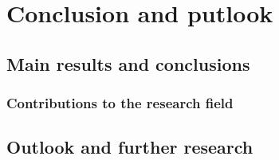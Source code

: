 \chapter{Conclusion and putlook}
\label{ch:conclusions}


\section{Main results and conclusions}


\subsection{Contributions to the research field}


\section{Outlook and further research}

